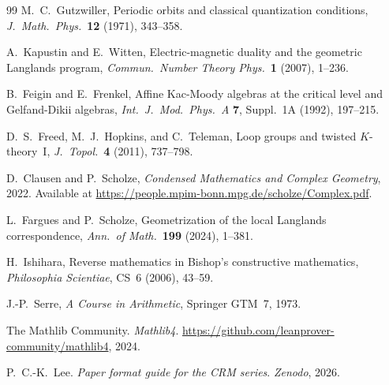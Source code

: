 \documentclass[11pt]{article}
\theoremstyle{definition}
\theoremstyle{remark}
\begin{document}
\begin{thebibliography}{99}
M.~C.~Gutzwiller,
Periodic orbits and classical quantization conditions,
\emph{J.\ Math.\ Phys.}\ \textbf{12} (1971), 343--358.

A.~Kapustin and E.~Witten,
Electric-magnetic duality and the geometric Langlands program,
\emph{Commun.\ Number Theory Phys.}\ \textbf{1} (2007), 1--236.

B.~Feigin and E.~Frenkel,
Affine Kac-Moody algebras at the critical level and Gelfand-Dikii algebras,
\emph{Int.\ J.\ Mod.\ Phys.~A} \textbf{7}, Suppl.~1A (1992), 197--215.

D.~S.~Freed, M.~J.~Hopkins, and C.~Teleman,
Loop groups and twisted $K$-theory~I,
\emph{J.~Topol.}\ \textbf{4} (2011), 737--798.

D.~Clausen and P.~Scholze,
\emph{Condensed Mathematics and Complex Geometry},
2022.
Available at \url{https://people.mpim-bonn.mpg.de/scholze/Complex.pdf}.

L.~Fargues and P.~Scholze,
Geometrization of the local Langlands correspondence,
\emph{Ann.\ of Math.}\ \textbf{199} (2024), 1--381.

H.~Ishihara,
Reverse mathematics in Bishop's constructive mathematics,
\emph{Philosophia Scientiae}, CS~6 (2006), 43--59.

J.-P.~Serre,
\emph{A Course in Arithmetic},
Springer GTM~7, 1973.

The Mathlib Community.
\textit{Mathlib4}.
\url{https://github.com/leanprover-community/mathlib4}, 2024.

P.~C.-K.~Lee.
\emph{Paper format guide for the CRM series}.
\textit{Zenodo}, 2026.

\end{thebibliography}
\end{document}
